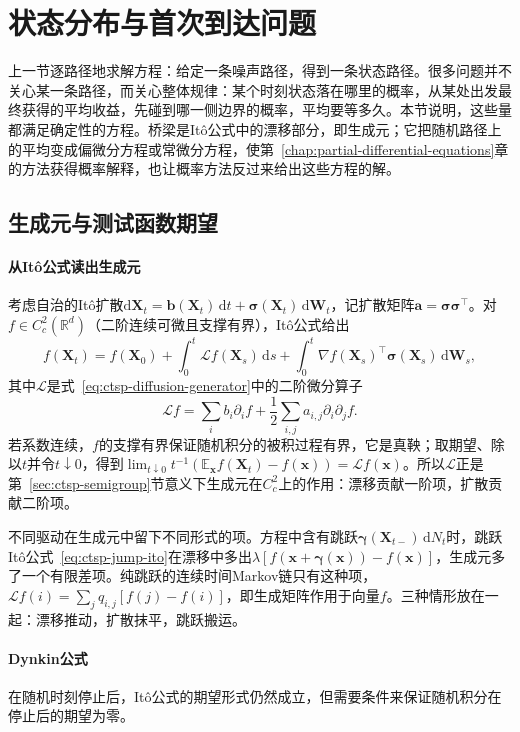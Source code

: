 \section{状态分布与首次到达问题}
\label{sec:ctsp-distributions}

上一节逐路径地求解方程：给定一条噪声路径，得到一条状态路径。很多问题并不关心某一条路径，而关心整体规律：某个时刻状态落在哪里的概率，从某处出发最终获得的平均收益，先碰到哪一侧边界的概率，平均要等多久。本节说明，这些量都满足确定性的方程。桥梁是Itô公式中的漂移部分，即生成元；它把随机路径上的平均变成偏微分方程或常微分方程，使第~\ref{chap:partial-differential-equations}章的方法获得概率解释，也让概率方法反过来给出这些方程的解。

\subsection{生成元与测试函数期望}
\label{sec:ctsp-generator-dynkin}

\paragraph{从Itô公式读出生成元}
考虑自治的Itô扩散$\mathrm d\bm X_t=\bm b(\bm X_t)\,\mathrm dt+\bm\sigma(\bm X_t)\,\mathrm d\bm W_t$，记扩散矩阵$\bm a=\bm\sigma\bm\sigma^\top$。对$f\in C^2_c(\mathbb R^d)$（二阶连续可微且支撑有界），Itô公式给出
\[
  f(\bm X_t)=f(\bm X_0)+\int_0^t\mathcal Lf(\bm X_s)\,\mathrm ds+\int_0^t\nabla f(\bm X_s)^\top\bm\sigma(\bm X_s)\,\mathrm d\bm W_s ,
\]
其中$\mathcal L$是式~\eqref{eq:ctsp-diffusion-generator}中的二阶微分算子
\begin{equation}
  \mathcal Lf=\sum_ib_i\partial_if+\frac12\sum_{i,j}a_{i,j}\partial_i\partial_jf .
  \label{eq:ctsp-generator-explicit}
\end{equation}
若系数连续，$f$的支撑有界保证随机积分的被积过程有界，它是真鞅；取期望、除以$t$并令$t\downarrow0$，得到$\lim_{t\downarrow0}t^{-1}(\mathbb E_{\bm x}f(\bm X_t)-f(\bm x))=\mathcal Lf(\bm x)$。所以$\mathcal L$正是第~\ref{sec:ctsp-semigroup}节意义下生成元在$C^2_c$上的作用：漂移贡献一阶项，扩散贡献二阶项。

不同驱动在生成元中留下不同形式的项。方程中含有跳跃$\bm\gamma(\bm X_{t-})\,\mathrm dN_t$时，跳跃Itô公式~\eqref{eq:ctsp-jump-ito}在漂移中多出$\lambda[f(\bm x+\bm\gamma(\bm x))-f(\bm x)]$，生成元多了一个有限差项。纯跳跃的连续时间Markov链只有这种项，$\mathcal Lf(i)=\sum_jq_{i,j}[f(j)-f(i)]$，即生成矩阵作用于向量$f$。三种情形放在一起：漂移推动，扩散抹平，跳跃搬运。

\paragraph{Dynkin公式}
在随机时刻停止后，Itô公式的期望形式仍然成立，但需要条件来保证随机积分在停止后的期望为零。

